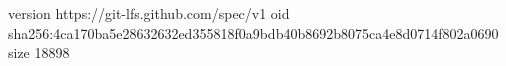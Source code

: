 version https://git-lfs.github.com/spec/v1
oid sha256:4ca170ba5e28632632ed355818f0a9bdb40b8692b8075ca4e8d0714f802a0690
size 18898
